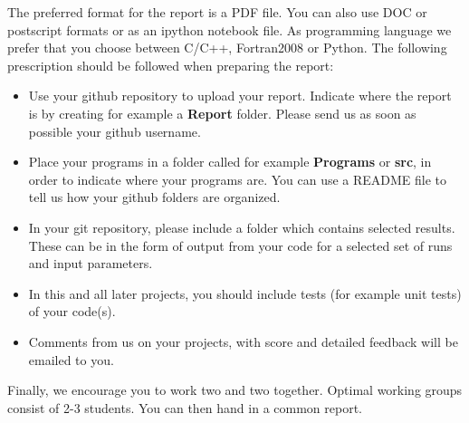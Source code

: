 \documentclass[%
oneside,                 %
final,                   %
10pt]{article}
\begin{document}
The preferred format for the report is a PDF file. You can also use DOC or postscript formats or as an ipython notebook file.  As programming language we prefer that you choose between C/C++, Fortran2008 or Python. The following prescription should be followed when preparing the report:


\begin{itemize}
  \item Use your github repository to upload your report. Indicate where the report is by creating for example a \textbf{Report} folder. Please send us as soon as possible your github username.

  \item Place your programs in a folder called for example \textbf{Programs} or \textbf{src}, in order to indicate where your programs are. You can use a README file to tell us how your github folders are organized. 

  \item In your git repository, please include a folder which contains selected results. These can be in the form of output from your code for a selected set of runs and input parameters.

  \item In this and all later projects, you should include tests (for example unit tests) of your code(s).

  \item Comments  from us on your projects, with score and detailed feedback will be emailed to you. 
\end{itemize}

\noindent
Finally, 
we encourage you to work two and two together. Optimal working groups consist of 
2-3 students. You can then hand in a common report. 




\end{document}
